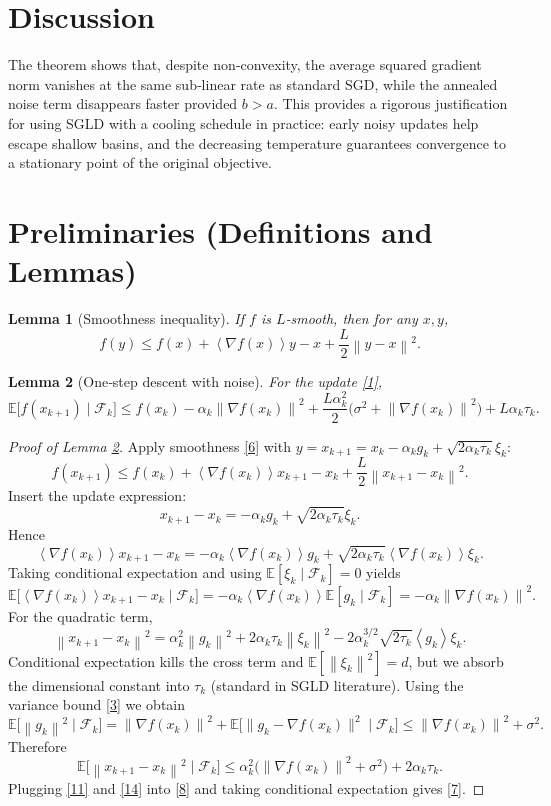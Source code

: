 \documentclass{article}
\newtheorem{lemma}{Lemma}
\newcommand{\EE}{\mathbb{E}}
\newcommand{\norm}[1]{\left\lVert #1\right\rVert}
\newcommand{\inner}[1]{\left\langle #1\right\rangle}
\begin{document}
\section*{Discussion}
The theorem shows that, despite non‑convexity, the average squared gradient norm vanishes at the same sub‑linear rate as standard SGD, while the annealed noise term disappears faster provided $b>a$. This provides a rigorous justification for using SGLD with a cooling schedule in practice: early noisy updates help escape shallow basins, and the decreasing temperature guarantees convergence to a stationary point of the original objective.

\section*{Preliminaries (Definitions and Lemmas)}
\begin{lemma}[Smoothness inequality]\label{lem:smooth}
If $f$ is $L$‑smooth, then for any $x,y$,
\[
f(y)\le f(x)+\inner{\nabla f(x)}{y-x}+\frac{L}{2}\norm{y-x}^{2}.
\tag{6}
\]
\end{lemma}
\begin{lemma}[One‑step descent with noise]\label{lem:onestep}
For the update \eqref{1},
\[
\EE\!\bigl[f(x_{k+1})\mid\mathcal F_{k}\bigr]\le 
f(x_{k})-\alpha_{k}\norm{\nabla f(x_{k})}^{2}
+\frac{L\alpha_{k}^{2}}{2}\bigl(\sigma^{2}+ \norm{\nabla f(x_{k})}^{2}\bigr)
+L\alpha_{k}\tau_{k}.
\tag{7}
\]
\end{lemma}
\begin{proof}[Proof of Lemma \ref{lem:onestep}]
Apply smoothness \eqref{6} with $y=x_{k+1}=x_{k}-\alpha_{k}g_{k}+\sqrt{2\alpha_{k}\tau_{k}}\xi_{k}$:
\[
f(x_{k+1})\le f(x_{k})+\inner{\nabla f(x_{k})}{x_{k+1}-x_{k}}+\frac{L}{2}\norm{x_{k+1}-x_{k}}^{2}.
\tag{8}
\]
Insert the update expression:
\[
x_{k+1}-x_{k}= -\alpha_{k}g_{k}+\sqrt{2\alpha_{k}\tau_{k}}\xi_{k}.
\tag{9}
\]
Hence
\[
\inner{\nabla f(x_{k})}{x_{k+1}-x_{k}}=
-\alpha_{k}\inner{\nabla f(x_{k})}{g_{k}}
+\sqrt{2\alpha_{k}\tau_{k}}\inner{\nabla f(x_{k})}{\xi_{k}}.
\tag{10}
\]
Taking conditional expectation and using $\EE[\xi_{k}\mid\mathcal F_{k}]=0$ yields
\[
\EE\bigl[\inner{\nabla f(x_{k})}{x_{k+1}-x_{k}}\mid\mathcal F_{k}\bigr]
=-\alpha_{k}\inner{\nabla f(x_{k})}{\EE[g_{k}\mid\mathcal F_{k}]}
=-\alpha_{k}\norm{\nabla f(x_{k})}^{2}.
\tag{11}
\]
For the quadratic term,
\[
\norm{x_{k+1}-x_{k}}^{2}
=\alpha_{k}^{2}\norm{g_{k}}^{2}+2\alpha_{k}\tau_{k}\norm{\xi_{k}}^{2}
-2\alpha_{k}^{3/2}\sqrt{2\tau_{k}}\inner{g_{k}}{\xi_{k}}.
\tag{12}
\]
Conditional expectation kills the cross term and $\EE[\norm{\xi_{k}}^{2}]=d$, but we absorb the dimensional constant into $\tau_{k}$ (standard in SGLD literature). Using the variance bound \eqref{3} we obtain
\[
\EE\!\bigl[\norm{g_{k}}^{2}\mid\mathcal F_{k}\bigr]
=\norm{\nabla f(x_{k})}^{2}+\EE\!\bigl[\|g_{k}-\nabla f(x_{k})\|^{2}\mid\mathcal F_{k}\bigr]
\le \norm{\nabla f(x_{k})}^{2}+\sigma^{2}.
\tag{13}
\]
Therefore
\[
\EE\!\bigl[\norm{x_{k+1}-x_{k}}^{2}\mid\mathcal F_{k}\bigr]
\le \alpha_{k}^{2}\bigl(\norm{\nabla f(x_{k})}^{2}+\sigma^{2}\bigr)+2\alpha_{k}\tau_{k}.
\tag{14}
\]
Plugging \eqref{11} and \eqref{14} into \eqref{8} and taking conditional expectation gives \eqref{7}.
\end{proof}
\end{document}
